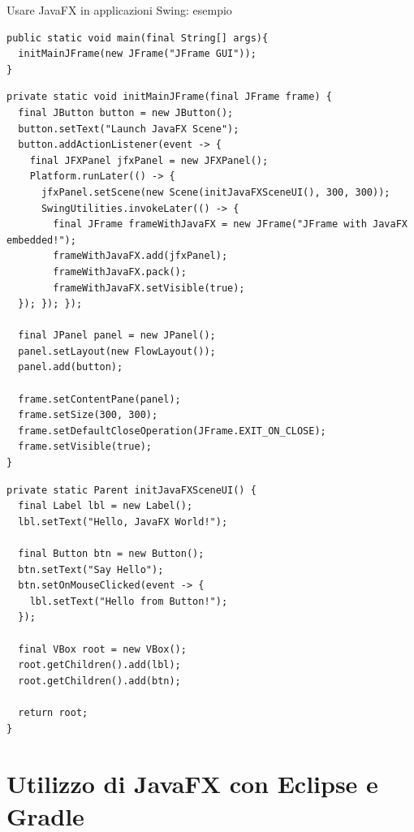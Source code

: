 \documentclass[presentation]{beamer}
\begin{document}
\begin{frame}{Usare JavaFX in applicazioni Swing: esempio}

\begin{lstlisting}[basicstyle=\tiny]
public static void main(final String[] args){
  initMainJFrame(new JFrame("JFrame GUI"));
}
\end{lstlisting}

\begin{lstlisting}[basicstyle=\tiny]
private static void initMainJFrame(final JFrame frame) {
  final JButton button = new JButton();
  button.setText("Launch JavaFX Scene");
  button.addActionListener(event -> {
    final JFXPanel jfxPanel = new JFXPanel();
    Platform.runLater(() -> {
      jfxPanel.setScene(new Scene(initJavaFXSceneUI(), 300, 300));
      SwingUtilities.invokeLater(() -> {
        final JFrame frameWithJavaFX = new JFrame("JFrame with JavaFX embedded!");
        frameWithJavaFX.add(jfxPanel);
        frameWithJavaFX.pack();
        frameWithJavaFX.setVisible(true);
  }); }); });

  final JPanel panel = new JPanel();
  panel.setLayout(new FlowLayout());
  panel.add(button);

  frame.setContentPane(panel);
  frame.setSize(300, 300);
  frame.setDefaultCloseOperation(JFrame.EXIT_ON_CLOSE);
  frame.setVisible(true);
}
\end{lstlisting}

\begin{lstlisting}[basicstyle=\tiny]
private static Parent initJavaFXSceneUI() {
  final Label lbl = new Label();
  lbl.setText("Hello, JavaFX World!");

  final Button btn = new Button();
  btn.setText("Say Hello");
  btn.setOnMouseClicked(event -> {
    lbl.setText("Hello from Button!");
  });

  final VBox root = new VBox();
  root.getChildren().add(lbl);
  root.getChildren().add(btn);

  return root;
}
\end{lstlisting}

\end{frame}

\section{Utilizzo di JavaFX con Eclipse e Gradle}
\end{document}
